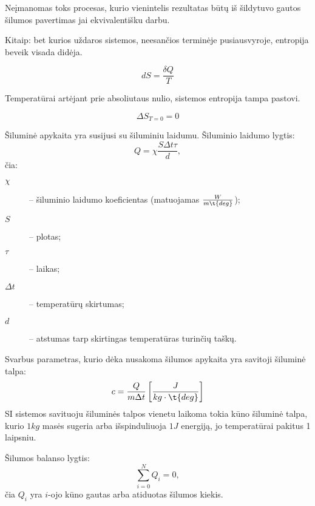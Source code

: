 \begin{defn}
  Neįmanomas toks procesas, kurio vienintelis rezultatas būtų iš
  šildytuvo gautos šilumos pavertimas jai ekvivalentišku darbu.

  Kitaip: bet kurios uždaros sistemos, neesančios terminėje pusiausvyroje,
  entropija beveik visada didėja.

  \begin{equation*}
    dS = \frac{\delta Q}{T}
  \end{equation*}
\end{defn}

\begin{defn}
  Temperatūrai artėjant prie absoliutaus nulio, sistemos entropija
  tampa pastovi.

  \begin{equation*}
    \Delta S_{T=0} = 0
  \end{equation*}
\end{defn}

Šiluminė apykaita yra susijusi su šiluminiu laidumu. Šiluminio
laidumo lygtis:
\begin{equation*}
  Q = \chi\frac{S \Delta t \tau}{d},
\end{equation*}
čia:
\begin{description}
  \item[$\chi$] – šiluminio laidumo koeficientas
    (matuojamas $\frac{W}{m \t{deg}}$);
  \item[$S$] – plotas;
  \item[$\tau$] – laikas;
  \item[$\Delta t$] – temperatūrų skirtumas;
  \item[$d$] – atstumas tarp skirtingas temperatūras turinčių taškų.
\end{description}

Svarbus parametras, kurio dėka nusakoma šilumos apykaita yra
savitoji šiluminė talpa:
\begin{equation*}
  c = \frac{Q}{m\Delta t} \left[ \frac{J}{kg\cdot\t{deg}} \right]
\end{equation*}
SI sistemos savituoju šiluminės talpos vienetu laikoma tokia kūno
šiluminė talpa, kurio $1 kg$ masės sugeria arba išspinduliuoja
$1 J$ energiją, jo temperatūrai pakitus 1 laipsniu.

Šilumos balanso lygtis:
\begin{equation*}
  \sum _{i=0} ^{N} Q_{i} = 0,
\end{equation*}
čia $Q_{i}$ yra $i$-ojo kūno gautas arba atiduotas šilumos kiekis.

